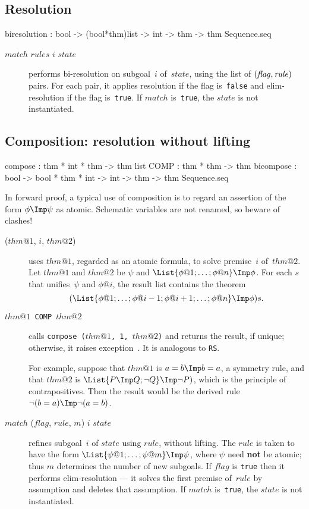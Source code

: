 \subsection{Resolution}
\begin{ttbox} 
biresolution : bool -> (bool*thm)list -> int -> thm
               -> thm Sequence.seq
\end{ttbox}
\begin{description}
\item[ $match$ $rules$ $i$ $state$] 
performs bi-resolution on subgoal~$i$ of~$state$, using the list of $\it
(flag,rule)$ pairs.  For each pair, it applies resolution if the flag
is~{\tt false} and elim-resolution if the flag is~{\tt true}.  If $match$
is~{\tt true}, the $state$ is not instantiated.
\end{description}


\subsection{Composition: resolution without lifting}
\begin{ttbox}
compose   : thm * int * thm -> thm list
COMP      : thm * thm -> thm
bicompose : bool -> bool * thm * int -> int -> thm
            -> thm Sequence.seq
\end{ttbox}
In forward proof, a typical use of composition is to regard an assertion of
the form $\phi\Imp\psi$ as atomic.  Schematic variables are not renamed, so
beware of clashes!
\begin{description}
\item[ ($thm@1$, $i$, $thm@2$)] 
uses $thm@1$, regarded as an atomic formula, to solve premise~$i$
of~$thm@2$.  Let $thm@1$ and $thm@2$ be $\psi$ and $\List{\phi@1; \ldots;
\phi@n} \Imp \phi$.  For each $s$ that unifies~$\psi$ and $\phi@i$, the
result list contains the theorem
\[ (\List{\phi@1; \ldots; \phi@{i-1}; \phi@{i+1}; \ldots; \phi@n} \Imp \phi)s.
\]

\item[\tt $thm@1$ COMP $thm@2$] 
calls \hbox{\tt compose ($thm@1$, 1, $thm@2$)} and returns the result, if
unique; otherwise, it raises exception~\@.  It is
analogous to {\tt RS}\@.  

For example, suppose that $thm@1$ is $a=b\Imp b=a$, a symmetry rule, and
that $thm@2$ is $\List{P\Imp Q; \neg Q} \Imp\neg P)$, which is the
principle of contrapositives.  Then the result would be the
derived rule $\neg(b=a)\Imp\neg(a=b)$.

\item[ $match$ ($flag$, $rule$, $m$) $i$ $state$]
refines subgoal~$i$ of $state$ using $rule$, without lifting.  The $rule$
is taken to have the form $\List{\psi@1; \ldots; \psi@m} \Imp \psi$, where
$\psi$ need {\bf not} be atomic; thus $m$ determines the number of new
subgoals.  If $flag$ is {\tt true} then it performs elim-resolution --- it
solves the first premise of~$rule$ by assumption and deletes that
assumption.  If $match$ is~{\tt true}, the $state$ is not instantiated.
\end{description}


